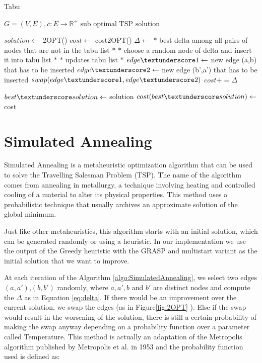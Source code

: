 \begin{algorithm}[!h]
    \caption{Tabu}\label{algo:tabu}
    \begin{algorithmic}[1]
    \Require $G = (V,E), c:E \to \mathbb{R}^+$
    \Ensure $\text{sub optimal TSP solution}$


    \State $solution \gets$ 2OPT()
    \State $cost \gets$ cost\textunderscore 2OPT()
    \State $\Delta\gets$ $*$ best delta among all pairs of nodes that are not in the tabu list $*$
    \State $*$ choose a random node of delta and insert it into tabu list $*$
    \State $*$ updates tabu list $*$
    \State $edge\textunderscore 1 \gets$ new edge (a,b) that has to be inserted
    \State $edge\textunderscore 2 \gets$ new edge (b',a') that has to be inserted
    \State $swap(edge\textunderscore 1,edge\textunderscore 2) $
    \State $cost += \Delta$

    \State $ best\textunderscore solution \gets$ solution
    \State $ cost(best\textunderscore solution) \gets$ cost
    \EndIf
    

    \EndWhile

    \end{algorithmic}
\end{algorithm}






\section{Simulated Annealing}

Simulated Annealing is a metaheuristic optimization algorithm that can be used to solve the Travelling Salesman Problem (TSP).
The name of the algorithm comes from annealing in metallurgy, a technique involving heating and controlled cooling of a material to alter its physical properties. This method uses a probabilistic technique that usually archives an approximate solution of the global minimum.

Just like other metaheuristics, this algorithm starts with an initial solution, which can be generated randomly or using a heuristic. In our implementation we use the output of the Greedy heuristic with the GRASP and multistart variant as the initial solution that we want to improve.

At each iteration of the Algorithm \ref{algo:SimulatedAnnealing}, we select two edges $(a,a')$,$(b,b')$ randomly, where $a,a',b$ and $b'$ are distinct nodes and compute the $\Delta$ as in Equation \ref{eq:delta}. If there would be an improvement over the current solution, we swap the edges (as in Figure\ref{fig:2OPT} ). Else if the swap would result in the worsening of the solution, there is still a certain probability of making the swap anyway depending on a probability function over a parameter called Temperature. This method is actually an adaptation of the Metropolis algorithm published by Metropolis et al. in 1953 and the probability function used is defined as:



